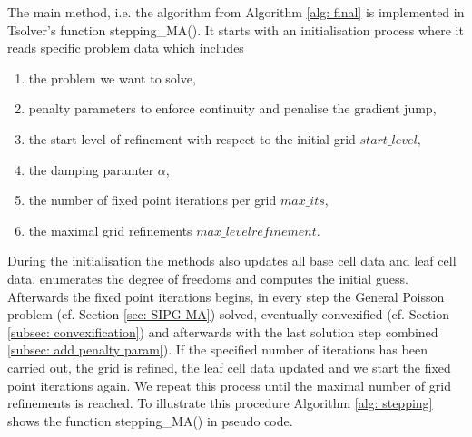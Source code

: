 The main method, i.e. the algorithm from Algorithm \ref{alg: final} is implemented in Tsolver's function stepping\_MA(). It starts with an initialisation process where it reads specific problem data which includes
\begin{enumerate}
 \item the problem we want to solve,
 \item penalty parameters to enforce continuity and penalise the gradient jump,
 \item the start level of refinement with respect to the initial grid $start\_level$,
 \item the damping paramter $\alpha$,
 \item the number of fixed point iterations per grid $max\_its$,
 \item the maximal grid refinements $max\_levelrefinement$.
\end{enumerate}
During the initialisation the methods also updates all base cell data and leaf cell data, enumerates the degree of freedoms and computes the initial guess.\\
Afterwards the fixed point iterations begins, in every step the General Poisson problem (cf. Section \ref{sec: SIPG MA}) solved, eventually convexified (cf. Section \ref{subsec: convexification}) and afterwards with the last solution step combined \ref{subsec: add penalty param}). If the specified number of iterations has been carried out, the grid is refined, the leaf cell data updated and we start the fixed point iterations again.
We repeat this process until the maximal number of grid refinements is reached.
To illustrate this procedure Algorithm \ref{alg: stepping} shows the function stepping\_MA() in pseudo code.
